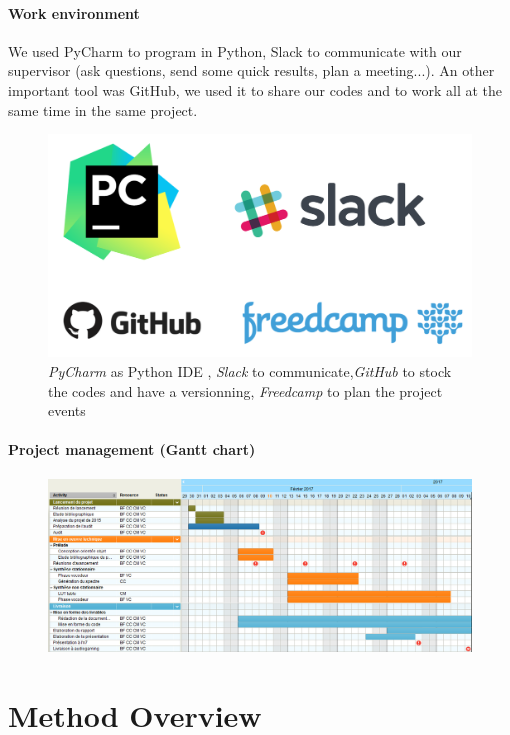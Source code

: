 \documentclass[]{article}
\begin{document}
\subsection{Work environment}
We used PyCharm to program in Python, Slack to communicate with our supervisor (ask questions, send some quick results, plan a meeting...). An other important tool was GitHub, we used it to share our codes and to work all at the same time in the same project. 
	\begin{figure}[H]
		\centering
		\includegraphics[scale=0.4]{all_softwares.png}
		\caption{ {\it PyCharm} as Python IDE , {\it Slack} to communicate,{\it GitHub} to stock the codes and have a versionning, {\it Freedcamp} to plan the project events }
	\end{figure}

\subsection{Project management (Gantt chart)}
\begin{figure}[H]
	\includegraphics[scale=0.28]{Gantt.png}
\end{figure}

\newpage
\part{Method Overview}\label{part:method-overview}
\end{document}
